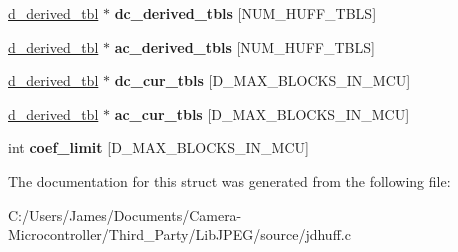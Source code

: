 \begin{DoxyCompactItemize}
\item 
\mbox{\label{structhuff__entropy__decoder_ab6e78f3f3c7cc8496517471f0bd5c9a6}} 
\hyperlink{structd__derived__tbl}{d\+\_\+derived\+\_\+tbl} $\ast$ {\bfseries dc\+\_\+derived\+\_\+tbls} \mbox{[}N\+U\+M\+\_\+\+H\+U\+F\+F\+\_\+\+T\+B\+LS\mbox{]}
\item 
\mbox{\label{structhuff__entropy__decoder_abd39c50538ccd1258fd7cada9748e9ec}} 
\hyperlink{structd__derived__tbl}{d\+\_\+derived\+\_\+tbl} $\ast$ {\bfseries ac\+\_\+derived\+\_\+tbls} \mbox{[}N\+U\+M\+\_\+\+H\+U\+F\+F\+\_\+\+T\+B\+LS\mbox{]}
\item 
\mbox{\label{structhuff__entropy__decoder_aa1e0b766840c5425b11a7cfdc035f22e}} 
\hyperlink{structd__derived__tbl}{d\+\_\+derived\+\_\+tbl} $\ast$ {\bfseries dc\+\_\+cur\+\_\+tbls} \mbox{[}D\+\_\+\+M\+A\+X\+\_\+\+B\+L\+O\+C\+K\+S\+\_\+\+I\+N\+\_\+\+M\+CU\mbox{]}
\item 
\mbox{\label{structhuff__entropy__decoder_ad429fde0ab4046bddba48d5cb9c4695b}} 
\hyperlink{structd__derived__tbl}{d\+\_\+derived\+\_\+tbl} $\ast$ {\bfseries ac\+\_\+cur\+\_\+tbls} \mbox{[}D\+\_\+\+M\+A\+X\+\_\+\+B\+L\+O\+C\+K\+S\+\_\+\+I\+N\+\_\+\+M\+CU\mbox{]}
\item 
\mbox{\label{structhuff__entropy__decoder_af3a57df869ae7482589bae52bf33f5eb}} 
int {\bfseries coef\+\_\+limit} \mbox{[}D\+\_\+\+M\+A\+X\+\_\+\+B\+L\+O\+C\+K\+S\+\_\+\+I\+N\+\_\+\+M\+CU\mbox{]}
\end{DoxyCompactItemize}


The documentation for this struct was generated from the following file\+:\begin{DoxyCompactItemize}
\item 
C\+:/\+Users/\+James/\+Documents/\+Camera-\/\+Microcontroller/\+Third\+\_\+\+Party/\+Lib\+J\+P\+E\+G/source/jdhuff.\+c\end{DoxyCompactItemize}
